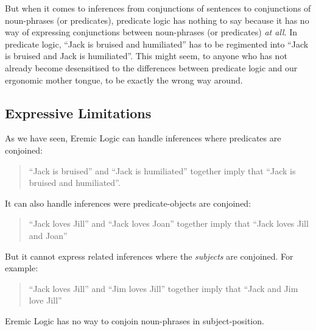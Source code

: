 But when it comes to inferences from conjunctions of sentences to conjunctions of noun-phrases (or predicates), predicate logic has nothing to say because it has no way of expressing conjunctions between noun-phrases (or predicates) \emph{at all}. In predicate logic, ``Jack is bruised and humiliated'' has to be regimented into ``Jack is bruised and Jack is humiliated''. 
This might seem, to anyone who has not already become desensitised to the differences between predicate logic and our ergonomic mother tongue, to be exactly the wrong way around.

\subsection{Expressive Limitations}
As we have seen, Eremic Logic can handle inferences where predicates are conjoined:
\begin{quote}
``Jack is bruised'' and ``Jack is humiliated'' together imply that ``Jack is bruised and humiliated''.
\end{quote}
It can also handle inferences were predicate-objects are conjoined:
\begin{quote}
``Jack loves Jill'' and ``Jack loves Joan'' together imply that ``Jack loves Jill and Joan''
\end{quote}
But it cannot express related inferences where the \emph{subjects} are conjoined. For example:
\begin{quote}
``Jack loves Jill'' and ``Jim loves Jill'' together imply that ``Jack and Jim love Jill''
\end{quote}
Eremic Logic has no way to conjoin noun-phrases in subject-position.
